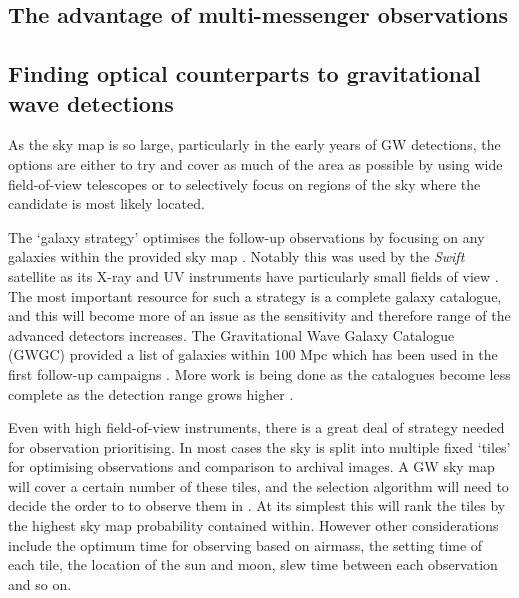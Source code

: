 \begin{colsection}
\begin{colsection}
\end{colsection}


\subsection{The advantage of multi-messenger observations}
\label{sec:mma_advantages}
\begin{colsection}


\end{colsection}


\subsection{Finding optical counterparts to gravitational wave detections}
\label{sec:followup}
\begin{colsection}

As the sky map is so large, particularly in the early years of GW detections, the options are either to try and cover as much of the area as possible by using wide field-of-view telescopes or to selectively focus on regions of the sky where the candidate is most likely located.

The `galaxy strategy' optimises the follow-up observations by focusing on any galaxies within the provided sky map \citep{LIGO-galaxys}. Notably this was used by the \emph{Swift} satellite as its X-ray and UV instruments have particularly small fields of view \cite{LIGO-firstrun-Swift,GW150914followup-Swift}. The most important resource for such a strategy is a complete galaxy catalogue, and this will become more of an issue as the sensitivity and therefore range of the advanced detectors increases. The Gravitational Wave Galaxy Catalogue (GWGC) provided a list of galaxies within 100 Mpc \citep{LIGO-GWGC} which has been used in the first follow-up campaigns \citep{LIGO-firstrun-Swift,GW150914followup-Swift}. More work is being done as the catalogues become less complete as the detection range grows higher \citep{LIGO-galaxys,LIGO-galaxys2}.

Even with high field-of-view instruments, there is a great deal of strategy needed for observation prioritising. In most cases the sky is split into multiple fixed `tiles' for optimising observations and comparison to archival images. A GW sky map will cover a certain number of these tiles, and the selection algorithm will need to decide the order to to observe them in \citep{LIGO-tiles-dutch, LIGO-tiles-india}. At its simplest this will rank the tiles by the highest sky map probability contained within. However other considerations include the optimum time for observing based on airmass, the setting time of each tile, the location of the sun and moon, slew time between each observation and so on.


\end{colsection}
\end{colsection}
